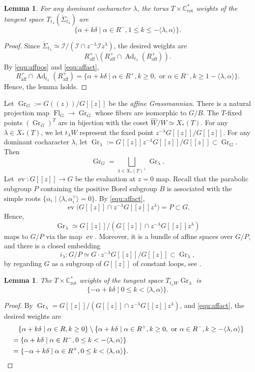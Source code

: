 \documentclass[12pt]{amsart}
\newtheorem{Lemma}[Th]{Lemma}
\def\Gr{\operatorname{Gr}}
\def\Gr{\operatorname{Gr}}
\def\Fl{\operatorname{Fl}}
\def\aff{\operatorname{aff}}
\def\rot{\operatorname{rot}}
\def\Ad{\operatorname{Ad}}
\def\ev{\operatorname{ev}}
\begin{document}
\begin{Lemma}\label{lem:tangentwt}
    For any dominant cocharacter $\lambda$, the torus $T\times \mathbb{C}^*_{\rot}$ weights of the tangent space $T_{t_\lambda}(\mathring{\Sigma}_{t_\lambda})$ are 
    \[\{\alpha+k\delta\mid \alpha\in R^-, 1\leq k\leq -\langle\lambda,\alpha\rangle\}.\]
\end{Lemma}
\begin{proof}
    Since $\mathring{\Sigma}_{t_\lambda}\simeq \mathcal{I}/(\mathcal{I}\cap z^{-\lambda} \mathcal{I} z^{\lambda})$, the desired weights are 
    \[R_{\aff}^+\setminus (R_{\aff}^+\cap \Ad_{t_\lambda}(R_{\aff}^+)).\]
    By  \eqref{equ:affpos} and \eqref{equ:affact},
    \[R_{\aff}^+\cap \Ad_{t_\lambda}(R_{\aff}^+)=\{\alpha+k\delta\mid \alpha\in R^+, k\geq 0,\text{ or } \alpha\in R^-, k\geq 1-\langle\lambda,\alpha\rangle \}.\]
    Hence, the lemma holds.
\end{proof}

Let $\Gr_G:= G(\!(z)\!)/G[[z]]$ be the {\it affine Grassmannian}. There is a natural projection map $\Fl_G\rightarrow
\Gr_G$ whose fibers are isomorphic to $G/B$. The $T$-fixed points $(\Gr_G)^T$ are in bijection with the coset $\widehat{W}/W\simeq X_*(T)$. For any $\lambda\in X_*(T)$, we let $t_\lambda W$ represent the fixed point $z^{-\lambda}G[[z]]/G[[z]]$. For any dominant cocharacter $\lambda$, let $\Gr_\lambda:=G[[z]]z^{-\lambda} G[[z]]/G[[z]]\subset \Gr_G$. Then 
\[\Gr_G=\bigsqcup_{\lambda\in X_*(T)^+}\Gr_\lambda.\]
Let $\ev:G[[z]]\rightarrow G$ be the evaluation at $z=0$ map. Recall that the parabolic subgroup $P$ containing the positive Borel subgroup $B$ is associated with the simple roots 
$\{\alpha_i\mid \langle \lambda,\alpha_i^\vee\rangle=0\}$. By  \eqref{equ:affact},
\[\ev\bigg(G[[z]]\cap z^{-\lambda} G[[z]]z^\lambda\bigg)=P\subset G.\]
Hence,
\[\Gr_\lambda\simeq G[[z]]/(G[[z]]\cap z^{-\lambda} G[[z]]z^\lambda)\]
maps to $G/P$ via the map $\ev$. Moreover, it
is a bundle of affine spaces over $G/P$, 
and there is a closed embedding 
\[i_\lambda:G/P\simeq G\cdot z^{-\lambda} G[[z]]/G[[z]]\subset \Gr_\lambda,\]
by regarding $G$ as a subgroup of $G[[z]]$ of constant loops, see \cite{Zhu}.
\begin{Lemma}\label{lem:tanweGr}
    The $T\times\mathbb{C}^*_{\rot}$ weights of the tangent space $T_{t_{\lambda}W}\Gr_\lambda$ is
    \[\{-\alpha+k\delta\mid 0\leq k< \langle\lambda,\alpha\rangle\}.\]
\end{Lemma}
\begin{proof}
    By $\Gr_\lambda=G[[z]]/(G[[z]]\cap z^{-\lambda} G[[z]]z^\lambda)$, and  \eqref{equ:affact},
    the desired weights are 
    \begin{align*}
        &\quad \{\alpha+k\delta\mid \alpha \in R, k\geq 0\}\setminus \{\alpha+k\delta\mid \alpha \in R^+, k\geq 0, \text{ or }\alpha\in R^-, k\geq -\langle\lambda,\alpha\rangle\}\\
        &=\{\alpha+k\delta\mid \alpha \in R^-, 0\leq k< -\langle\lambda,\alpha\rangle\}\\
        &=\{-\alpha+k\delta\mid \alpha \in R^+, 0\leq k< \langle\lambda,\alpha\rangle\}.
    \qedhere
    \end{align*}
\end{proof}
\end{document}
